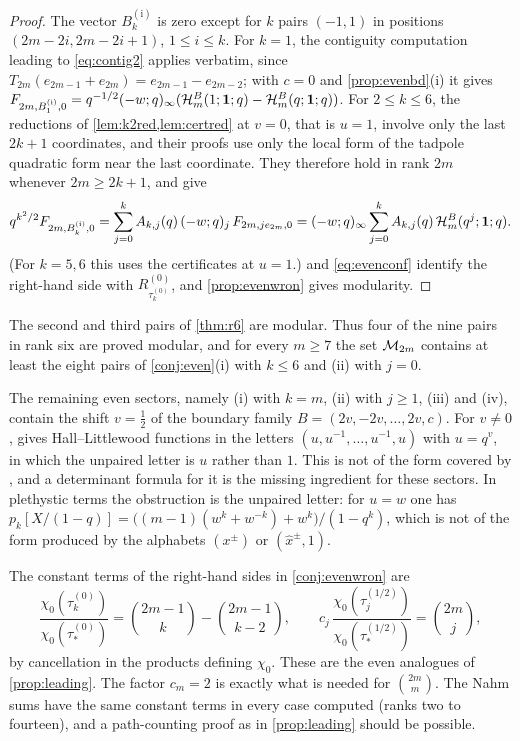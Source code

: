 \begin{proof}
The vector $B^{\mathrm{(i)}}_k$ is zero except for $k$ pairs $(-1,1)$ in positions $(2m-2i,2m-2i+1)$, $1\le i\le k$. For $k=1$, the contiguity computation leading to \eqref{eq:contig2} applies verbatim, since $T_{2m}(e_{2m-1}+e_{2m})=e_{2m-1}-e_{2m-2}$; with $c=0$ and \cref{prop:evenbd}(i) it gives $F_{2m,B^{\mathrm{(i)}}_1,0}=q^{-1/2}(-w;q)_\infty(\mathcal{H}^B_m(1;\mathbf{1};q)-\mathcal{H}^B_m(q;\mathbf{1};q))$. For $2\le k\le6$, the reductions of \cref{lem:k2red,lem:certred} at $v=0$, that is $u=1$, involve only the last $2k+1$ coordinates, and their proofs use only the local form of the tadpole quadratic form near the last coordinate. They therefore hold in rank $2m$ whenever $2m\ge2k+1$, and give
\[
q^{k^2/2}F_{2m,B^{\mathrm{(i)}}_k,0}=\sum_{j=0}^kA_{k,j}(q)\,(-w;q)_j\,F_{2m,je_{2m},0}=(-w;q)_\infty\sum_{j=0}^kA_{k,j}(q)\,\mathcal{H}^B_m(q^j;\mathbf{1};q).
\]
(For $k=5,6$ this uses the certificates at $u=1$.)  and \eqref{eq:evenconf} identify the right-hand side with $R^{(0)}_{\tau^{(0)}_k}$, and \cref{prop:evenwron} gives modularity.
\end{proof}

\begin{corollary}\label{cor:r6more}
The second and third pairs of \cref{thm:r6} are modular. Thus four of the nine pairs in rank six are proved modular, and for every $m\ge7$ the set $\mathcal{M}_{2m}$ contains at least the eight pairs of \cref{conj:even}(i) with $k\le6$ and (ii) with $j=0$.
\end{corollary}

The remaining even sectors, namely (i) with $k=m$, (ii) with $j\ge1$, (iii) and (iv), contain the shift $v=\frac12$ of the boundary family $B=(2v,-2v,\dots,2v,c)$. For $v\ne0$, \cite[Theorem~3.7]{BW15} gives Hall--Littlewood functions in the letters $(u,u^{-1},\dots,u^{-1},u)$ with $u=q^v$, in which the unpaired letter is $u$ rather than $1$. This is not of the form covered by \cite[(5.6b)]{BW15}, and a determinant formula for it is the missing ingredient for these sectors. In plethystic terms the obstruction is the unpaired letter: for $u=w$ one has $p_k[X/(1-q)]=\bigl((m-1)(w^k+w^{-k})+w^k\bigr)/(1-q^k)$, which is not of the form produced by the alphabets $(x^\pm)$ or $(\hat x^\pm,1)$.

\begin{remark}\label{rem:evenlead}
The constant terms of the right-hand sides in \cref{conj:evenwron} are
\[
\frac{\chi_0(\tau^{(0)}_k)}{\chi_0(\tau^{(0)}_*)}=\binom{2m-1}{k}-\binom{2m-1}{k-2},\qquad c_j\,\frac{\chi_0(\tau^{(1/2)}_j)}{\chi_0(\tau^{(1/2)}_*)}=\binom{2m}{j},
\]
by cancellation in the products defining $\chi_0$. These are the even analogues of \cref{prop:leading}. The factor $c_m=2$ is exactly what is needed for $\binom{2m}{m}$. The Nahm sums have the same constant terms in every case computed (ranks two to fourteen), and a path-counting proof as in \cref{prop:leading} should be possible.
\end{remark}
